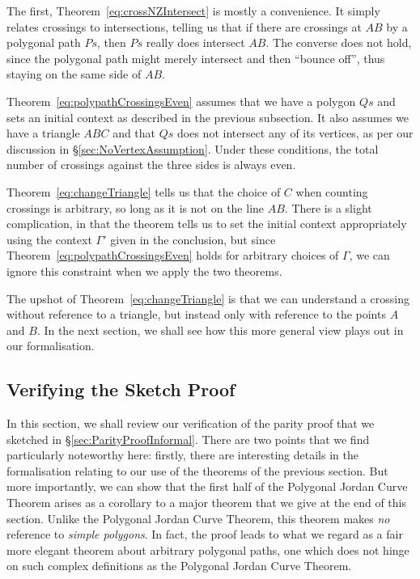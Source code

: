 The first, Theorem~\ref{eq:crossNZIntersect} is mostly a convenience. It simply relates crossings to intersections, telling us that if there are crossings at $AB$ by a polygonal path $Ps$, then $Ps$ really does intersect $AB$. The converse does not hold, since the polygonal path might merely intersect and then ``bounce off'', thus staying on the same side of $AB$.

Theorem~\ref{eq:polypathCrossingsEven} assumes that we have a polygon $Qs$ and sets an initial context as described in the previous subsection. It also assumes we have a triangle $ABC$ and that $Qs$ does not intersect any of its vertices, as per our discussion in \S\ref{sec:NoVertexAssumption}. Under these conditions, the total number of crossings against the three sides is always even.

Theorem~\ref{eq:changeTriangle} tells us that the choice of $C$ when counting crossings is arbitrary, so long as it is not on the line $AB$. There is a slight complication, in that the theorem tells us to set the initial context appropriately using the context $\Gamma'$ given in the conclusion, but since Theorem~\ref{eq:polypathCrossingsEven} holds for arbitrary choices of $\Gamma$, we can ignore this constraint when we apply the two theorems.

The upshot of Theorem~\ref{eq:changeTriangle} is that we can understand a crossing without reference to a triangle, but instead only with reference to the points $A$ and $B$. In the next section, we shall see how this more general view plays out in our formalisation.

\subsection{Verifying the Sketch Proof}
In this section, we shall review our verification of the parity proof that we sketched in \S\ref{sec:ParityProofInformal}. There are two points that we find particularly noteworthy here: firstly, there are interesting details in the formalisation relating to our use of the theorems of the previous section. But more importantly, we can show that the first half of the Polygonal Jordan Curve Theorem arises as a corollary to a major theorem that we give at the end of this section. Unlike the Polygonal Jordan Curve Theorem, this theorem makes \emph{no} reference to \emph{simple polygons}. In fact, the proof leads to what we regard as a fair more elegant theorem about arbitrary polygonal paths, one which does not hinge on such complex definitions as the Polygonal Jordan Curve Theorem.

